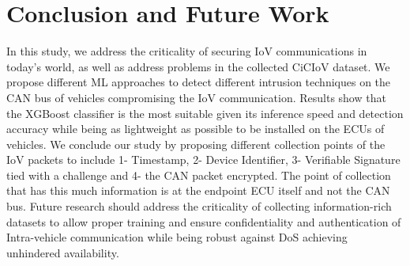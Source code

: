 \documentclass[conference]{IEEEtran}
\begin{document}
\section{Conclusion and Future Work}
\label{sec:conclusion}
In this study, we address the criticality of securing IoV communications in today's world, as well as address problems in the collected CiCIoV dataset. We propose different ML approaches to detect different intrusion techniques on the CAN bus of vehicles compromising the IoV communication. Results show that the XGBoost classifier is the most suitable given its inference speed and detection accuracy while being as lightweight as possible to be installed on the ECUs of vehicles. We conclude our study by proposing different collection points of the IoV packets to include 1- Timestamp, 2- Device Identifier, 3- Verifiable Signature tied with a challenge and 4- the CAN packet encrypted. The point of collection that has this much information is at the endpoint ECU itself and not the CAN bus. Future research should address the criticality of collecting information-rich datasets to allow proper training and ensure confidentiality and authentication of Intra-vehicle communication while being robust against DoS achieving unhindered availability.



\end{document}
